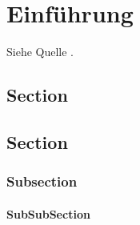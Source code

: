 \chapter{Einführung}
Siehe Quelle \cite{BlindBuch}.
\section{Section}


 
 \section{Section}
 
 \subsection{Subsection}
 
 \subsubsection{SubSubSection}